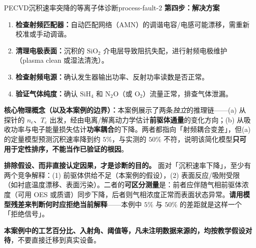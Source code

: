 \documentclass[12pt,a4paper,openany,oneside]{book}
\begin{document}
\begin{example}{PECVD沉积速率突降的等离子体诊断}{process-fault-2}
\textbf{第四步：解决方案}

\begin{enumerate}
    \item \textbf{检查射频匹配器：}自动匹配网络（AMN）的调谐电容/电感可能漂移，需重新校准或手动调谐。
    \item \textbf{清理电极表面：}沉积的 $\mathrm{SiO}_2$ 介电层导致阻抗失配，进行射频电极维护（plasma clean 或湿法清洗）。
    \item \textbf{检查射频电源：}确认发生器输出功率、反射功率读数是否正常。
    \item \textbf{验证气体纯度：}确认 $\mathrm{SiH}_4$ 和 $\mathrm{N}_2\mathrm{O}$（或 $\mathrm{O}_2$）流量正常，排查气体泄漏。
\end{enumerate}

\textbf{核心物理概念（以及本案例的边界）：}本案例展示了两条\emph{独立}的推理链——(a) 从探针的 $n_e$、$T_e$ 出发，经由电离/解离动力学估计\textbf{前驱体通量}的变化方向；(b) 从吸收功率与电子能量损失估计\textbf{功率耦合}的下降。两者都指向「射频耦合变差」，但(a) 的定量模型预测沉积速率降到约 $5\%$，与实测的 $50\%$ 不符，说明该简化模型\textbf{只可用于定性排序，不能当作已验证的根因}。

\textbf{排除假设、而非直接认定因果，才是诊断的目的。} 面对「沉积速率下降」，至少有两个竞争解释：(1) 前驱体供给不足（本案例的假设），(2) 表面反应/吸附受限（如衬底温度漂移、表面污染）。二者的\textbf{可区分测量}是：前者应伴随气相前驱体浓度（可用 OES 或质谱）同步下降，后者则气相浓度正常而表面状态异常。\textbf{请用模型残差来判断何时应拒绝当前解释}——本例中 $5\%$ 与 $50\%$ 的差距就是这样一个「拒绝信号」。

\textbf{本案例中的工艺百分比、入射角、阈值等，凡未注明数据来源的，均按教学假设对待}，不要直接迁移到真实设备。
\end{example}
\end{document}
